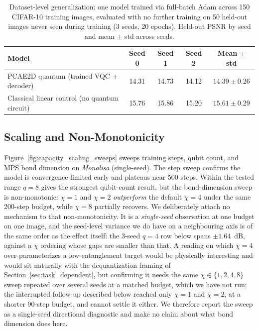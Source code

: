 \documentclass[11pt]{article}
\begin{document}
\begin{table}[H]
\centering
\caption{Dataset-level generalization: one model trained via full-batch Adam across 150 CIFAR-10 training images, evaluated with no further training on 50 held-out images never seen during training (3 seeds, 20 epochs). Held-out PSNR by seed and mean $\pm$ std across seeds.}
\label{tab:dataset_level_generalization}
\scriptsize
\begin{tabular}{lcccc}
\toprule
Model & Seed 0 & Seed 1 & Seed 2 & Mean $\pm$ std \\
\midrule
PCAE2D quantum (trained VQC + decoder) & 14.31 & 14.73 & 14.12 & $14.39\pm0.26$ \\
Classical linear control (no quantum circuit) & 15.76 & 15.86 & 15.20 & $15.61\pm0.29$ \\
\bottomrule
\end{tabular}
\end{table}

\subsection{Scaling and Non-Monotonicity}
Figure~\ref{fig:capacity_scaling_sweeps} sweeps training steps, qubit count, and MPS bond dimension on \textit{Monalisa} (single-seed). The step sweep confirms the model is convergence-limited early and plateaus near 500 steps. Within the tested range $q=8$ gives the strongest qubit-count result, but the bond-dimension sweep is non-monotonic: $\chi=1$ and $\chi=2$ \emph{outperform} the default $\chi=4$ under the same 200-step budget, while $\chi=8$ partially recovers. We deliberately attach no mechanism to that non-monotonicity. It is a \emph{single-seed} observation at one budget on one image, and the seed-level variance we do have on a neighbouring axis is of the same order as the effect itself: the 3-seed $q=4$ row below spans $\pm1.64$~dB, against a $\chi$ ordering whose gaps are smaller than that. A reading on which $\chi=4$ over-parameterizes a low-entanglement target would be physically interesting and would sit naturally with the dequantization framing of Section~\ref{sec:task_dependent}, but confirming it needs the same $\chi\in\{1,2,4,8\}$ sweep repeated over several seeds at a matched budget, which we have not run; the interrupted follow-up described below reached only $\chi=1$ and $\chi=2$, at a shorter 90-step budget, and cannot settle it either. We therefore report the sweep as a single-seed directional diagnostic and make no claim about what bond dimension does here.
\end{document}
